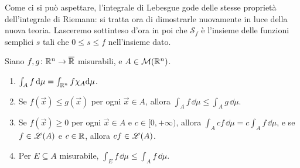 Come ci si può aspettare, l'integrale di Lebesgue gode delle stesse proprietà dell'integrale di Riemann: si tratta ora di dimostrarle nuovamente in luce della nuova teoria.
Lasceremo sottinteso d'ora in poi che $\mathcal S_f$ è l'insieme delle funzioni semplici $s$ tali che $0\leq s\leq f$ nell'insieme dato.
\begin{proprieta} \label{pr:integrale-lebesgue}
	Siano $f,g\colon\mathbb{R}^n\to\overline{\mathbb{R}}$ misurabili, e $A\in\mathcal M(\mathbb{R}^n)$.
	\begin{enumerate}
		\item $\int_Af\,\textup{d}\mu=\int_{\mathbb{R}^n}f\chi_A\textup{d}\mu$.
		\item Se $f(\vec x)\leq g(\vec x)$ per ogni $\vec x\in A$, allora $\int_A f\,\dd\mu\leq\int_Ag\,\dd\mu$.
		\item Se $f(\vec x)\geq 0$ per ogni $\vec x\in A$ e $c\in[0,+\infty)$, allora $\int_Acf\,\dd\mu=c\int_Af\,\dd\mu$, e se $f\in\mathscr L(A)$ e $c\in\mathbb{R}$, allora $cf\in\mathscr L(A)$.
		\item Per $E\subseteq A$ misurabile, $\int_Ef\,\dd\mu\leq\int_Af\,\dd\mu$.
	\end{enumerate}
\end{proprieta}
